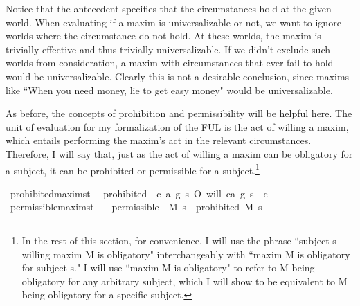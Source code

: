 \begin{isabellebody}
{Notice that the antecedent specifies that the circumstances hold at the given world. 
When evaluating if a maxim is universalizable or not, we want to ignore worlds where the circumstance 
do not hold. At these worlds, the maxim is trivially effective and thus trivially universalizable. If we didn't exclude such worlds from 
consideration, a maxim with circumstances that ever fail to hold would be universalizable. Clearly 
this is not a desirable conclusion, since maxims like ``When you need money, lie to get easy money"
would be universalizable.%
}%
\begin{isamarkuptext}%
As before, the concepts of prohibition and permissibility will be helpful here. The unit of 
evaluation for my formalization of the FUL is the act of willing a maxim, which entails performing 
the maxim's act in the relevant circumstances. Therefore, I will say that, just as the act of willing a
 maxim can be obligatory for a subject, it can be prohibited or permissible for a subject.\footnote{In 
the rest of this section, for convenience, I will use the phrase ``subject s willing maxim M is obligatory" 
interchangeably with ``maxim M is obligatory for subject s." I will use ``maxim M is obligatory" to 
refer to M being obligatory for any arbitrary subject, which I will show to be equivalent to M being 
obligatory for a specific subject.}%
\end{isamarkuptext}\isamarkuptrue%
\isamarkupfalse%
\ prohibited{\isacharcolon}{\isacharcolon}{\isachardoublequoteopen}maxim{\isasymRightarrow}s{\isasymRightarrow}t{\isachardoublequoteclose}\ \ \isanewline
{\isachardoublequoteopen}prohibited\ {\isasymequiv}\ {\isasymlambda}{\isacharparenleft}c{\isacharcomma}\ a{\isacharcomma}\ g{\isacharparenright}\ s{\isachardot}\ O{\isacharbraceleft}\isactrlbold {\isasymnot}\ {\isacharparenleft}will\ {\isacharparenleft}c{\isacharcomma}a{\isacharcomma}\ g{\isacharparenright}\ s{\isacharparenright}\ {\isacharbar}\ c{\isacharbraceright}{\isachardoublequoteclose}\isanewline
\isanewline
{}\isamarkupfalse%
\ permissible{\isacharcolon}{\isacharcolon}{\isachardoublequoteopen}maxim{\isasymRightarrow}s{\isasymRightarrow}t{\isachardoublequoteclose}\isanewline
\ \ \ {\isachardoublequoteopen}permissible\ {\isasymequiv}\ {\isasymlambda}M\ s{\isachardot}\ \isactrlbold {\isasymnot}\ {\isacharparenleft}prohibited\ M\ s{\isacharparenright}{\isachardoublequoteclose}\isanewline
%
\end{isabellebody}
